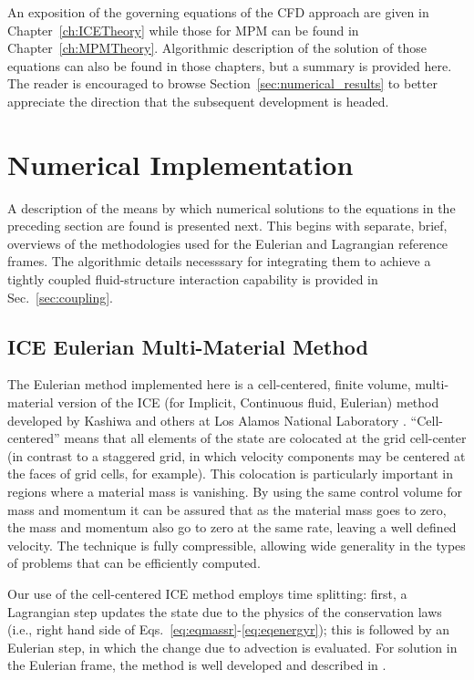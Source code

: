 An exposition of the governing equations of the CFD approach are given
in Chapter~\ref{ch:ICETheory} while those for MPM can be found in
Chapter~\ref{ch:MPMTheory}.  Algorithmic description of the solution of those 
equations can also be found in those chapters, but a summary is provided here.
The reader is encouraged to 
browse Section~\ref{sec:numerical_results}  to better appreciate
the direction that the subsequent development is headed.

\section{Numerical Implementation}\label{sec:numerical_algorithm}

A description of the means by which numerical solutions to the equations in 
the preceding section are found is presented next.  This begins with 
separate, brief, overviews of the methodologies used for the Eulerian and 
Lagrangian reference frames.  The algorithmic details necesssary for
integrating them to achieve a tightly coupled fluid-structure interaction 
capability is provided in Sec.~\ref{sec:coupling}.

\subsection{ICE Eulerian Multi-Material Method}\label{sec:EulerianMFM}

The Eulerian method implemented here is a
cell-centered, finite volume, multi-material version of the ICE
(for Implicit, Continuous fluid, Eulerian) method \cite{Harlow1968}
developed by Kashiwa and others at Los Alamos National
Laboratory \cite{Kashiwa1994a}.  ``Cell-centered'' means that all elements
of the state are colocated at the grid cell-center (in contrast to a 
staggered grid,
in which velocity components may be centered at the faces of grid cells, for
example).  This colocation is particularly important in regions where a
material mass is vanishing.  By using the same control volume for mass and
momentum it can be assured that as the material mass goes to zero, the mass
and momentum also go to zero at the same rate, leaving a well defined
velocity.  The technique is fully compressible, allowing wide generality in
the types of problems that can be efficiently computed. 
 
Our use of the cell-centered ICE method employs time splitting: first, a
Lagrangian step updates the state due to the physics of the conservation laws
(i.e., right hand side of Eqs.~{\ref{eq:eqmassr}-\ref{eq:eqenergyr}}); this is
followed by an Eulerian step, in which the change due to advection is
evaluated.  For solution in the Eulerian frame, the method is well developed
and described in \cite{Kashiwa1994a}.  

